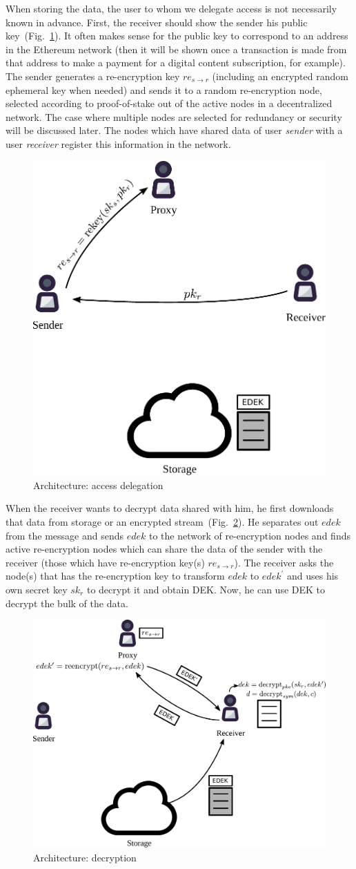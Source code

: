 \documentclass[notitlepage,longbibliography]{revtex4-1}
\begin{document}
When storing the data, the user to whom we delegate access is not necessarily known in advance.
First, the receiver should show the sender his public key~(Fig.~\ref{fig:arch-delegate}).
It often makes sense for the public key to correspond to an address in the Ethereum network (then it will be shown once a transaction is made from that
address to make a payment for a digital content subscription, for example).
The sender generates a re-encryption key $re_{s\rightarrow r}$ (including an encrypted random ephemeral key when needed) and sends it to a random re-encryption
node, selected according to proof-of-stake out of the active nodes in a decentralized network.
The case where multiple nodes are selected for redundancy or security will be discussed later.
The nodes which have shared data of user \emph{sender} with a user \emph{receiver} register this information in the network.
\begin{figure}
\centering
    \includegraphics[width=0.4\columnwidth]{pdf/delegate.pdf}
    \caption{Architecture: access delegation}
    \label{fig:arch-delegate}
\end{figure}

When the receiver wants to decrypt data shared with him, he first downloads that data from storage or an encrypted stream~(Fig.~\ref{fig:arch-decrypt}).
He separates out $edek$ from the message and sends $edek$ to the network of re-encryption nodes and finds active re-encryption nodes which can share the data
of the sender with the receiver (those which have re-encryption key(s) $re_{s\rightarrow r}$).
The receiver asks the node(s) that has the re-encryption key to transform $edek$ to $edek^{\prime}$ and uses his own secret key $sk_r$ to decrypt it and
obtain DEK.
Now, he can use DEK to decrypt the bulk of the data.
\begin{figure}
\centering
    \includegraphics[width=0.6\columnwidth]{pdf/decrypt.pdf}
    \caption{Architecture: decryption}
    \label{fig:arch-decrypt}
\end{figure}
\end{document}
